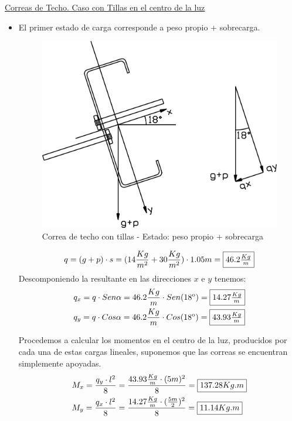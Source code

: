 \item \underline{Correas de Techo. Caso con Tillas en el centro de la luz}\\
\begin{itemize}
\item El primer estado de carga corresponde a peso propio + sobrecarga.

\begin{figure}[H]
\begin{center}
     \includegraphics[scale = 1]{chapters/chapter_2/images/figura3.png}
\caption{Correa de techo con tillas - Estado: peso propio + sobrecarga}
\end{center}
\end{figure}

$$q= (g+p)\cdot s = (14 \frac{Kg}{m^2}+30 \frac{Kg}{m^2}) \cdot 1.05m = \framebox{$46.2 \frac{Kg}{m}$}$$
Descomponiendo la resultante en las direcciones $x$ e $y$ tenemos:
\begin{align*}
& q_x=q \cdot Sen \alpha= 46.2 \frac{Kg}{m} \cdot Sen(18\textsuperscript{o})= \framebox{$14.27 \frac{Kg}{m}$}\\
& q_y=q \cdot Cos \alpha= 46.2 \frac{Kg}{m} \cdot Cos(18\textsuperscript{o})= \framebox{$43.93 \frac{Kg}{m}$}
\end{align*}

Procedemos a calcular los momentos en el centro de la luz, producidos por cada una de estas cargas lineales, suponemos que las correas se encuentran simplemente apoyadas.
\begin{align*}
& M_x= \frac{q_y \cdot l^2}{8} = \frac{43.93 \frac{Kg}{m} \cdot (5m)^2}{8} = \framebox{$137.28 Kg.m$} \\
& M_y= \frac{q_x \cdot l^2}{8} = \frac{14.27 \frac{Kg}{m} \cdot (\frac{5m}{2})^2}{8} = \framebox{$11.14 Kg.m$}
\end{align*}


\end{itemize}
